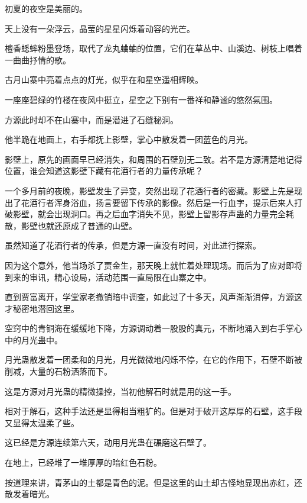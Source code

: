
\begin{this_body}



初夏的夜空是美丽的。

天上没有一朵浮云，晶莹的星星闪烁着动容的光芒。

檀香蟋蟀粉墨登场，取代了龙丸蛐蛐的位置，它们在草丛中、山溪边、树枝上唱着一曲曲抒情的歌。

古月山寨中亮着点点的灯光，似乎在和星空遥相辉映。

一座座碧绿的竹楼在夜风中挺立，星空之下别有一番祥和静谧的悠然氛围。

方源此时却不在山寨中，而是潜进了石缝秘洞。

他半跪在地面上，右手都抚上影壁，掌心中散发着一团蓝色的月光。

影壁上，原先的画面早已经消失，和周围的石壁别无二致。若不是方源清楚地记得位置，谁会知道这影壁下藏有花酒行者的力量传承呢？

一个多月前的夜晚，影壁发生了异变，突然出现了花酒行者的密藏。影壁上先是现出了花酒行者浑身浴血，扬言要留下传承的影像。然后是一行血字，提示后来人打破影壁，就会出现洞口。再之后血字消失不见，影壁上留影存声蛊的力量完全耗散，影壁也就还原成了普通的山壁。

虽然知道了花酒行者的传承，但是方源一直没有时间，对此进行探索。

因为这个意外，他当场杀了贾金生，那天晚上就忙着处理现场。而后为了应对即将到来的审讯，精心设局，活动范围一直局限在山寨之中。

直到贾富离开，学堂家老撤销暗中调查，如此过了十多天，风声渐渐消停，方源这才秘密地潜回这里。

空窍中的青铜海在缓缓地下降，方源调动着一股股的真元，不断地涌入到右手掌心中的月光蛊中。

月光蛊散发着一团柔和的月光，月光微微地闪烁不停，在它的作用下，石壁不断被削减，大量的石粉洒落而下。

这是方源对月光蛊的精微操控，当初他解石时就是用的这一手。

相对于解石，这种手法还是显得相当粗犷的。但是对于破开这厚厚的石壁，这手段又显得太温柔了些。

这已经是方源连续第六天，动用月光蛊在碾磨这石壁了。

在地上，已经堆了一堆厚厚的暗红色石粉。

按道理来讲，青茅山的土都是青色的泥。但是这里的山土却古怪地显现出赤红，还散发着暗光。


\end{this_body}

